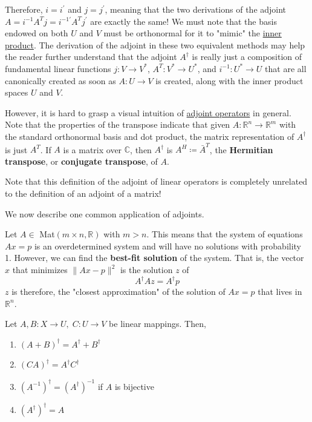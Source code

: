   Therefore, $i = i^\prime$ and $j = j^\prime$, meaning that the two derivations of the adjoint $A = i^{-1} A^T j = i^{-1 \prime} A^T j^\prime$ are exactly the same! We must note that the basis endowed on both $U$ and $V$ must be orthonormal for it to "mimic" the \hyperref[def:inner-product]{inner product}. The derivation of the adjoint in these two equivalent methods may help the reader further understand that the adjoint $A^\dagger$ is really just a composition of fundamental linear functions $j: V \to V^\ast$, $A^T: V^\ast \to U^\ast$, and $i^{-1}: U^\ast \to U$ that are all canonically created as soon as $A: U \to V$ is created, along with the inner product spaces $U$ and $V$. 

  However, it is hard to grasp a visual intuition of \hyperref[def:adjoint-operator]{adjoint operators} in general. Note that the properties of the transpose indicate that given $A: \mathbb{R}^n \to \mathbb{R}^m$ with the standard orthonormal basis and dot product, the matrix representation of $A^\dagger$ is just $A^T$. If $A$ is a matrix over $\mathbb{C}$, then $A^\dagger$ is $A^H \coloneqq \bar{A}^T$, the \textbf{Hermitian transpose}, or \textbf{conjugate transpose}, of $A$. 

  Note that this definition of the adjoint of linear operators is completely unrelated to the definition of an adjoint of a matrix! 

  We now describe one common application of adjoints. 
  \begin{theorem}
    \label{thm:least-squares-solution-of-an-overdetermined}
    Let $A \in$ Mat$(m \times n, \mathbb{R})$ with $m > n$. This means that the system of equations $A x = p$ is an overdetermined system and will have no solutions with probability 1. However, we can find the \textbf{best-fit solution} of the system. That is, the vector $x$ that minimizes $\|A x -p\|^2$ is the solution $z$ of 
    \begin{equation}
      A^\dagger A z = A^\dagger p
    \end{equation}
    $z$ is therefore, the "closest approximation" of the solution of $A x = p$ that lives in $\mathbb{R}^n$. 
  \end{theorem}

  \begin{theorem}
    \label{thm:properties-of-the-adjoint}
 
		Let $A, B: X \to U, \; C: U \to V$ be linear mappings. Then, 
    \begin{enumerate}
      \item $(A + B)^\dagger = A^\dagger + B^\dagger$
      \item $(C A)^\dagger = A^\dagger C^\dagger$
      \item $(A^{-1})^\dagger = (A^\dagger)^{-1}$ if $A$ is bijective
      \item $(A^\dagger)^\dagger = A$
    \end{enumerate}
  \end{theorem}

